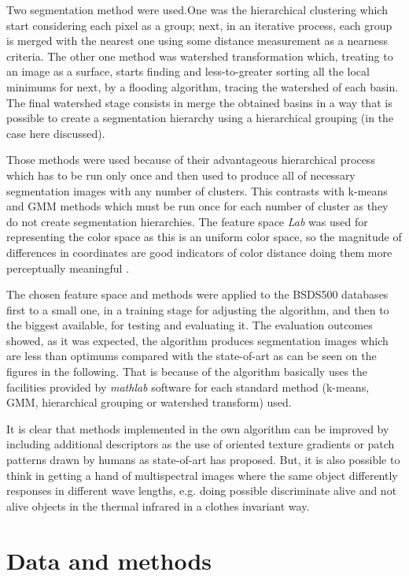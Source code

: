 \documentclass[10pt,twocolumn,letterpaper]{article}
\begin{document}
Two segmentation method were used.One was the hierarchical clustering which start considering each pixel as a group; next, in an iterative process, each group is merged with the nearest one using some distance measurement as a nearness criteria. The other one method was watershed transformation which, treating to an image as a surface, starts finding and less-to-greater sorting all the local minimums for next, by a flooding algorithm, tracing the watershed of each basin. The final watershed stage consists in merge the obtained basins in a way that is possible to create a segmentation hierarchy using a hierarchical grouping (in the case here discussed).

Those methods were used because of their advantageous hierarchical process which has to be run only once and then used to produce all of necessary segmentation images with any number of clusters. This contrasts with k-means and GMM methods which must be run once for each number of cluster as they do not create segmentation hierarchies. The feature space \textit{Lab} was used for representing the color space as this is an uniform color space, so the magnitude of differences in coordinates are good indicators of color distance doing them more perceptually meaningful \cite{Szeliski2010}.

The chosen feature space and methods were applied to the BSDS500 databases first to a small one, in a training stage for adjusting the algorithm, and then to the biggest available, for testing and evaluating it. The evaluation outcomes showed, as it was expected, the algorithm produces segmentation images which are less than optimums compared with the state-of-art as can be seen on the figures in the following. That is because of the algorithm basically uses the facilities provided by \textit{mathlab} software for each standard method (k-means, GMM, hierarchical grouping or watershed transform) used.

It is clear that methods implemented in the own algorithm can be improved by including additional descriptors as the use of oriented texture gradients or patch patterns drawn by humans as state-of-art has proposed. But, it is also possible to think in getting a hand of multispectral images where the same object differently responses in different wave lengths, e.g. doing possible discriminate alive and not alive objects in the thermal infrared in a clothes invariant way.

\section{Data and methods}
\end{document}
